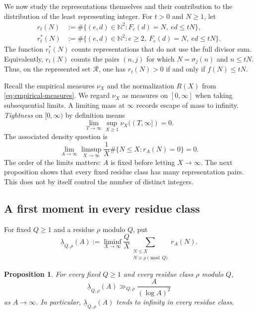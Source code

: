 \documentclass[11pt,letterpaper,reqno]{amsart}
\numberwithin{equation}{section}
\newtheorem{proposition}[theorem]{Proposition}
\theoremstyle{remark}
\newcommand{\N}{\mathbb{N}}
\newcommand{\Rcal}{\mathcal{R}}
\renewcommand{\leq}{\leqslant}
\renewcommand{\geq}{\geqslant}
\begin{document}
We now study the representations themselves and their contribution to the
distribution of the least representing integer. For $t>0$ and $N\geq1$,
let
\begin{align*}
 r_t(N)&:=\#\{(e,d)\in\N^2:F_e(d)=N,\ ed\leq tN\},\\
 r_t^*(N)&:=\#\{(e,d)\in\N^2:e\geq2,\ F_e(d)=N,\ ed\leq tN\}.
\end{align*}
The function $r_t^*(N)$ counts representations that do not use the
full divisor sum. Equivalently, $r_t(N)$ counts the pairs $(n,j)$ for
which $N=\sigma_j(n)$ and $n\leq tN$. Thus, on the represented set
$\Rcal$, one has $r_t(N)>0$ if and only if $f(N)\leq tN$.

Recall the empirical measures $\nu_X$ and the normalization $R(X)$ from
\eqref{eq:empirical-measures}. We regard $\nu_X$ as measures on $[0,\infty]$ when taking
subsequential limits. A limiting mass at $\infty$ records escape of mass
to infinity. \emph{Tightness} on $[0,\infty)$ by definition means
\[
 \lim_{T\to\infty}\sup_{X\geq1}\nu_X((T,\infty])=0.
\]
The associated density question is
\begin{equation}\label{eq:T}
 \lim_{A\to\infty}\limsup_{X\to\infty}
 \frac1X\#\{N\leq X:r_A(N)=0\}=0.
\end{equation}
The order of the limits matters: $A$ is fixed before letting $X\to\infty$.
The next proposition shows that every fixed residue class has many
representation pairs. This does not by itself control the number of
distinct integers.

\subsection{A first moment in every residue class}

For fixed $Q\geq1$ and a residue $\rho$ modulo $Q$, put
\[
 \underline{\lambda}_{Q,\rho}(A)
 :=\liminf_{X\to\infty}\frac QX
 \sum_{\substack{N\leq X\\N\equiv\rho\pmod Q}}r_A(N).
\]

\begin{proposition}
\label{prop:class-first-moment}
For every fixed $Q\geq1$ and every residue class $\rho$ modulo $Q$,
\[
 \underline{\lambda}_{Q,\rho}(A)
 \gg_{Q,\rho}\frac{A}{(\log A)^2}
\]
as $A\to\infty$.
In particular, $\underline{\lambda}_{Q,\rho}(A)$ tends to infinity in every residue
class.
\end{proposition}
\end{document}

